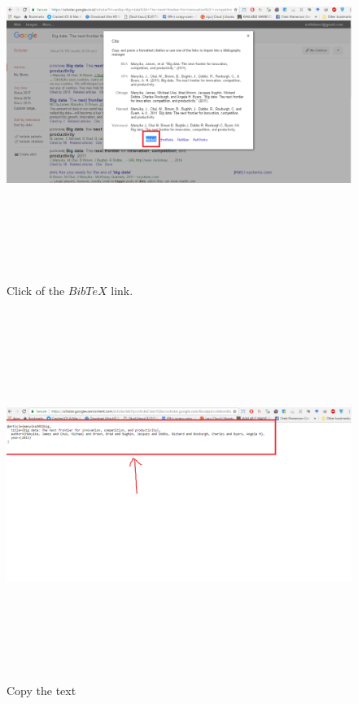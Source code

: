 \documentclass[preprint]{elsarticle}
\begin{document}
\begin{figure}[H]
\centering
\includegraphics[width=120mm, height=120mm, keepaspectratio]{get_bib_script_part_3}
\caption{Click of the $BibTeX$ link.}
\label{fig:fig3_3}
\end{figure}

\begin{figure}[H]
\centering
\includegraphics[width=120mm, height=120mm, keepaspectratio]{get_bib_script_part_4}
\caption{Copy the text}
\label{fig:fig3_4}
\end{figure}
\end{document}

